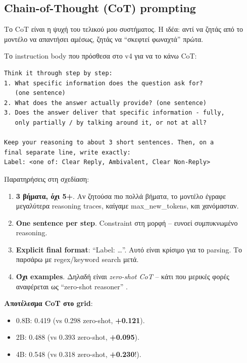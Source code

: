 \documentclass[12pt]{fphw}
\begin{document}
\subsection{Chain-of-Thought (CoT) prompting}

Το CoT είναι η ψυχή του τελικού μου συστήματος. Η ιδέα: αντί να ζητάς από το μοντέλο να απαντήσει αμέσως, ζητάς να ``σκεφτεί φωναχτά'' πρώτα.

Το instruction body που πρόσθεσα στο v4 για να το κάνω CoT:

\begin{verbatim}
Think it through step by step:
1. What specific information does the question ask for?
   (one sentence)
2. What does the answer actually provide? (one sentence)
3. Does the answer deliver that specific information - fully,
   only partially / by talking around it, or not at all?

Keep your reasoning to about 3 short sentences. Then, on a
final separate line, write exactly:
Label: <one of: Clear Reply, Ambivalent, Clear Non-Reply>
\end{verbatim}

Παρατηρήσεις στη σχεδίαση:

\begin{enumerate}
    \item \textbf{3 βήματα, όχι 5+}. Αν ζητούσα πιο πολλά βήματα, το μοντέλο έγραφε μεγαλύτερα reasoning traces, καίγαμε max\_new\_tokens, και χανόμασταν.
    \item \textbf{One sentence per step}. Constraint στη μορφή -- ευνοεί συμπυκνωμένο reasoning.
    \item \textbf{Explicit final format}: ``Label: \dots''. Αυτό είναι κρίσιμο για το parsing. Το παρσάρω με regex/keyword search μετά.
    \item \textbf{Όχι examples}. Δηλαδή είναι \emph{zero-shot CoT} -- κάτι που μερικές φορές αναφέρεται ως ``zero-shot reasoner'' \cite{kojima2022zerocot}.
\end{enumerate}

\textbf{Αποτέλεσμα CoT στο grid}:

\begin{itemize}
    \item 0.8B: 0.419 (vs 0.298 zero-shot, \textbf{+0.121}).
    \item 2B: 0.488 (vs 0.393 zero-shot, \textbf{+0.095}).
    \item 4B: 0.548 (vs 0.318 zero-shot, \textbf{+0.230}!).
\end{itemize}
\end{document}
